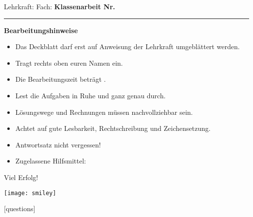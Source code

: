 
\firstpageheadrule

\coverheader
	{Lehrkraft: \lehrname\linebreak
		Fach: \ufach \linebreak
		\lstniveau}
	{\medskip\Large{\textbf{Klassenarbeit Nr. \kanr}} \linebreak
		\normalsize{\kathema}}
	{{}}
\begin{coverpages}
\vspace*{-0.7cm}\hrule \vspace*{0.5cm}
\begin{large}
\textbf{Bearbeitungshinweise}
\end{large}
\begin{itemize}
\item Das Deckblatt darf erst auf Anweisung der Lehrkraft umgeblättert werden.
\item Tragt rechts oben euren Namen ein.
\item Die Bearbeitungszeit beträgt \bearbzeit .
\item Lest die Aufgaben in Ruhe und ganz genau durch.
\item Lösungswege und Rechnungen müssen nachvollziehbar sein.
\item Achtet auf gute Lesbarkeit, Rechtschreibung und Zeichensetzung.
\item Antwortsatz nicht vergessen!
\item Zugelassene Hilfsmittel: \zglhilf
\end{itemize}
\vspace*{0.3cm}
\begin{center}
\begin{huge}
Viel Erfolg!
\end{huge}
\linebreak\texttt{[image: smiley]}
\linebreak
\hdashrule[0.1ex]{18.5cm}{0.5mm}{3mm 3pt} 
\end{center}
\begin{center}
\cellwidth{2.2em}
\newcommand{\bwrtzeilen}{1}
\multirowgradetable{%
  \numrows
}[questions]


\end{center}
\end{coverpages}
